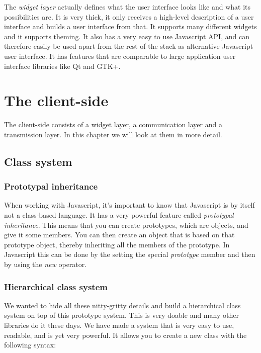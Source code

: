 \documentclass[11pt,a4paper]{article}
\begin{document}
The \textit{widget layer} actually defines what the user interface looks like and what its possibilities are.
It is very thick, it only receives a high-level description of a user interface and builds a user interface from that.
It supports many different widgets and it supports theming.
It also has a very easy to use Javascript API, and can therefore easily be used apart from the rest of the stack as alternative Javascript user interface.
It has features that are comparable to large application user interface libraries like Qt and GTK+.

\newpage
\section{The client-side}

The client-side consists of a widget layer, a communication layer and a transmission layer.
In this chapter we will look at them in more detail.

\subsection{Class system}

\subsubsection{Prototypal inheritance}
When working with Javascript, it's important to know that Javascript is by itself not a class-based language.
It has a very powerful feature called \textit{prototypal inheritance}.
This means that you can create prototypes, which are objects, and give it some members.
You can then create an object that is based on that prototype object, thereby inheriting all the members of the prototype.
In Javascript this can be done by the setting the special \textit{prototype} member and then by using the \textit{new} operator.

\subsubsection{Hierarchical class system}
We wanted to hide all these nitty-gritty details and build a hierarchical class system on top of this prototype system.
This is very doable and many other libraries do it these days.
We have made a system that is very easy to use, readable, and is yet very powerful.
It allows you to create a new class with the following syntax:
\end{document}
